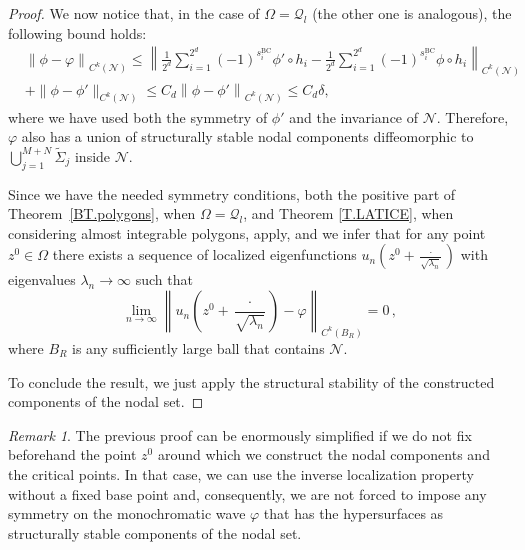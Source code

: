 \documentclass{amsart}
\theoremstyle{definition}
\theoremstyle{remark}
\newtheorem{remark}[theorem]{Remark}
\newcommand{\la}{\lambda}
\newcommand{\Si}{\Sigma}
\renewcommand\leq\leqslant
\numberwithin{equation}{section}
\theoremstyle{definition}
\theoremstyle{remark}
\begin{document}
\begin{proof}
    We now notice that, in the case of $\Omega=\mathcal{Q}_l$ (the other one is analogous), the following bound holds:\begin{equation}
        \begin{aligned}
           & \left\|{\phi}-\varphi\right\|_{C^{k}(\mathcal{N})}\leq\left\|\frac{1}{2^d}\sum_{i=1}^{2^d}\left(-1\right)^{s_i^{\mathrm{BC}}}{\phi'}\circ h_i-\frac{1}{2^d}\sum_{i=1}^{2^d}\left(-1\right)^{s_i^{\mathrm{BC}}}\phi\circ h_i\right\|_{C^{k}(\mathcal{N})} \\&+\|\phi-\phi'\|_{C^k(\mathcal N)}\leq C_d\left\|{\phi}-\phi'\right\|_{C^{k}(\mathcal{N})}\leq C_d{\delta},
        \end{aligned}
    \end{equation}where we have used both the symmetry of ${\phi'}$ and the invariance of $\mathcal{N}$. Therefore, $\varphi$ also has a union of structurally stable nodal components diffeomorphic to $\bigcup_{j=1}^{M+N}\tilde{\Si}_j$ inside  $\mathcal N$.

    Since we have the needed symmetry conditions, both the positive part of Theorem~\ref{BT.polygons}, when $\Omega=\mathcal{Q}_l$, and Theorem \ref{T.LATICE}, when considering almost integrable polygons, apply, and we infer that for any point $z^0\in\Omega$ there exists a sequence of localized eigenfunctions $u_n\left(z^0+\frac{\cdot}{\sqrt{\la_n}}\right)$ with eigenvalues $\la_n\to\infty$ such that
	\begin{equation}
	\lim_{n\to\infty}\left\|u_n\left(z^0+\frac{\cdot}{\sqrt{\la_n}}\right)-\varphi\right\|_{C^{k}(B_R)}=0\,,
	\end{equation}
	where $B_R$ is any sufficiently large ball that contains $\mathcal N$.
    
	To conclude the result, we just apply the structural stability of the constructed components of the nodal set. 
   
\end{proof}
\begin{remark}
	The previous proof can be enormously simplified if we do not fix beforehand the point $z^0$ around which we construct the nodal components and the critical points. In that case, we can use the inverse localization property without a fixed base point and, consequently, we are not forced to impose any symmetry on the monochromatic wave $\varphi$ that has the hypersurfaces as structurally stable components of the nodal set.
\end{remark}
\end{document}
